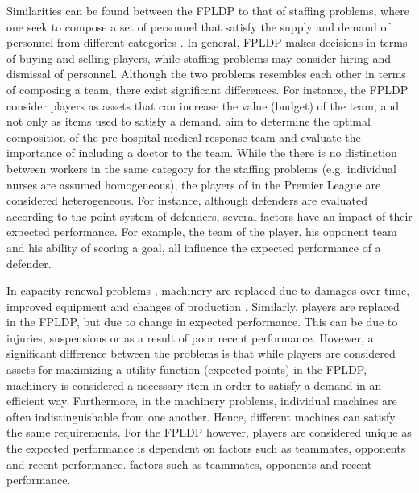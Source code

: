 Similarities can be found between the FPLDP to that of staffing problems, where one seek to compose a set of personnel that satisfy the supply and demand of personnel from different categories \citep{Komarudin,Bruecker}. In general, FPLDP makes decisions in terms of buying and selling players, while staffing problems may consider hiring and dismissal of personnel. Although the two problems resembles each other in terms of composing a team, there exist significant differences. For instance, the FPLDP consider players as assets that can increase the value (budget) of the team, and not only as items used to satisfy a demand. \cite{Davis} aim to determine the optimal composition of the pre-hospital medical response team and evaluate the importance of including a doctor to the team. While the there is no distinction between workers in the same category for the staffing problems (e.g. individual nurses are assumed homogeneous), the players of in the Premier League are considered heterogeneous. For instance, although defenders are evaluated according to the point system of defenders, several factors have an impact of their expected performance. For example, the team of the player, his opponent team and his ability of scoring a goal, all influence the expected performance of a defender. 

\newpar

In capacity renewal problems \citep{Chand,Rajagopalan}, machinery are replaced due to damages over time, improved equipment and changes of production \citep{Hopp,Adkins}. Similarly, players are replaced in the FPLDP, but due to change in expected performance. This can be due to injuries, suspensions or as a result of poor recent performance. Hovewer, a significant difference between the problems is that while players are considered assets for maximizing a utility function (expected points) in the FPLDP, machinery is considered a necessary item in order to satisfy a demand in an efficient way. Furthermore, in the machinery problems, individual machines are often indistinguishable from one another. Hence, different machines can satisfy the same requirements. For the FPLDP however, players are considered unique as the expected performance is dependent on factors such as teammates, opponents and recent performance. factors such as teammates, opponents and recent performance. 

\newpar

